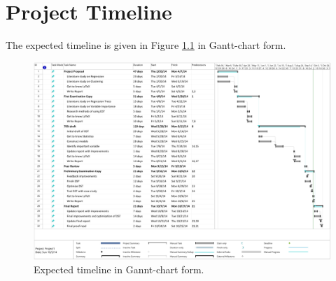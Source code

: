 \chapter{Project Timeline}

The expected timeline is given in Figure \ref{Ganttchart} in Gantt-chart form.


\begin{figure}[htb]
\centering
\includegraphics[angle=90,scale=0.6,trim=0 0 0 0, clip]{example/Timeline}
\caption{Expected timeline in Gannt-chart form.}
\label{Ganttchart}
\end{figure}